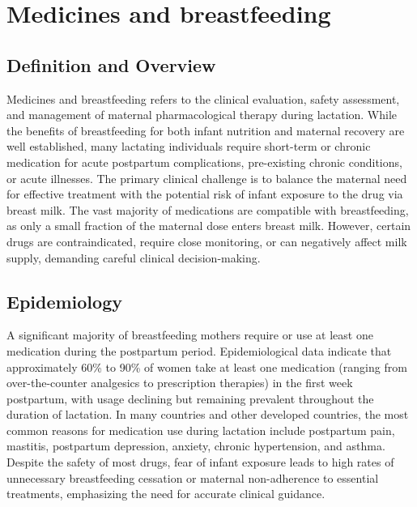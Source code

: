 \chapter{Medicines and breastfeeding}

\section*{Definition and Overview}
Medicines and breastfeeding refers to the clinical evaluation, safety assessment, and management of maternal pharmacological therapy during lactation. While the benefits of breastfeeding for both infant nutrition and maternal recovery are well established, many lactating individuals require short-term or chronic medication for acute postpartum complications, pre-existing chronic conditions, or acute illnesses. The primary clinical challenge is to balance the maternal need for effective treatment with the potential risk of infant exposure to the drug via breast milk. The vast majority of medications are compatible with breastfeeding, as only a small fraction of the maternal dose enters breast milk. However, certain drugs are contraindicated, require close monitoring, or can negatively affect milk supply, demanding careful clinical decision-making.

\section*{Epidemiology}
A significant majority of breastfeeding mothers require or use at least one medication during the postpartum period. Epidemiological data indicate that approximately 60\% to 90\% of women take at least one medication (ranging from over-the-counter analgesics to prescription therapies) in the first week postpartum, with usage declining but remaining prevalent throughout the duration of lactation. In many countries and other developed countries, the most common reasons for medication use during lactation include postpartum pain, mastitis, postpartum depression, anxiety, chronic hypertension, and asthma. Despite the safety of most drugs, fear of infant exposure leads to high rates of unnecessary breastfeeding cessation or maternal non-adherence to essential treatments, emphasizing the need for accurate clinical guidance.

